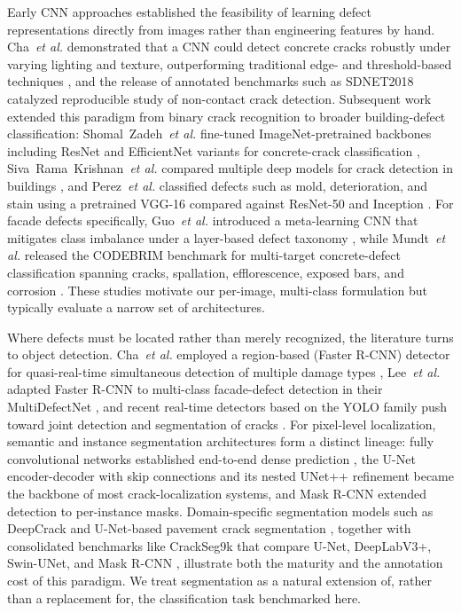 \documentclass[ASNA, twocolumn]{USG}
\begin{document}
Early CNN approaches established the feasibility of learning defect representations directly from images rather than engineering features by hand. Cha~\textit{et al.} demonstrated that a CNN could detect concrete cracks robustly under varying lighting and texture, outperforming traditional edge- and threshold-based techniques \cite{ref5}, and the release of annotated benchmarks such as SDNET2018 \cite{ref6} catalyzed reproducible study of non-contact crack detection. Subsequent work extended this paradigm from binary crack recognition to broader building-defect classification: Shomal~Zadeh~\textit{et al.} fine-tuned ImageNet-pretrained backbones including ResNet and EfficientNet variants for concrete-crack classification \cite{ref7}, Siva~Rama~Krishnan~\textit{et al.} compared multiple deep models for crack detection in buildings \cite{ref8}, and Perez~\textit{et al.} classified defects such as mold, deterioration, and stain using a pretrained VGG-16 compared against ResNet-50 and Inception \cite{ref9}. For facade defects specifically, Guo~\textit{et al.} introduced a meta-learning CNN that mitigates class imbalance under a layer-based defect taxonomy \cite{ref10}, while Mundt~\textit{et al.} released the CODEBRIM benchmark for multi-target concrete-defect classification spanning cracks, spallation, efflorescence, exposed bars, and corrosion \cite{ref11}. These studies motivate our per-image, multi-class formulation but typically evaluate a narrow set of architectures.

Where defects must be located rather than merely recognized, the literature turns to object detection. Cha~\textit{et al.} employed a region-based (Faster R-CNN) detector for quasi-real-time simultaneous detection of multiple damage types \cite{ref12}, Lee~\textit{et al.} adapted Faster R-CNN to multi-class facade-defect detection in their MultiDefectNet \cite{ref13}, and recent real-time detectors based on the YOLO family push toward joint detection and segmentation of cracks \cite{ref14}. For pixel-level localization, semantic and instance segmentation architectures form a distinct lineage: fully convolutional networks established end-to-end dense prediction \cite{ref15}, the U-Net encoder-decoder with skip connections \cite{ref16} and its nested UNet++ refinement \cite{ref17} became the backbone of most crack-localization systems, and Mask R-CNN \cite{ref18} extended detection to per-instance masks. Domain-specific segmentation models such as DeepCrack \cite{ref19} and U-Net-based pavement crack segmentation \cite{ref20}, together with consolidated benchmarks like CrackSeg9k that compare U-Net, DeepLabV3+, Swin-UNet, and Mask R-CNN \cite{ref21}, illustrate both the maturity and the annotation cost of this paradigm. We treat segmentation as a natural extension of, rather than a replacement for, the classification task benchmarked here.
\end{document}
